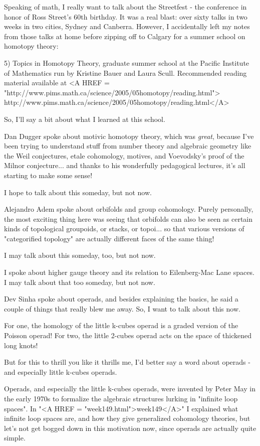 Speaking of math, I really want to talk about the Streetfest - the 
conference in honor of Ross Street's 60th birthday.  It was a real 
blast: over sixty talks in two weeks in two cities, Sydney and 
Canberra.  However, I accidentally left my notes from those talks 
at home before zipping off to Calgary for a summer school on 
homotopy theory:

5) Topics in Homotopy Theory, graduate summer school at the 
Pacific Institute of Mathematics run by Kristine Bauer and Laura 
Scull.  Recommended reading material available at 
<A HREF = "http://www.pims.math.ca/science/2005/05homotopy/reading.html">
http://www.pims.math.ca/science/2005/05homotopy/reading.html</A>

So, I'll say a bit about what I learned at this school.  

Dan Dugger spoke about motivic homotopy theory, which was
\emph{great}, because I've been trying to understand stuff
from number theory and algebraic geometry like the Weil 
conjectures, etale cohomology, motives, and Voevodsky's proof 
of the Milnor conjecture... and thanks to his wonderfully 
pedagogical lectures, it's all starting to make some sense!

I hope to talk about this someday, but not now.

Alejandro Adem spoke about orbifolds and group cohomology.
Purely personally, the most exciting thing here was seeing
that orbifolds can also be seen as certain kinds of topological 
groupoids, or stacks, or topoi... so that various versions of
"categorified topology" are actually different faces of the 
same thing!
  
I may talk about this someday, too, but not now.

I spoke about higher gauge theory and its relation to Eilenberg-Mac 
Lane spaces.  I may talk about that too someday, but not now.

Dev Sinha spoke about operads, and besides explaining the basics, 
he said a couple of things that really blew me away.  So, I want
to talk about this now.

For one, the homology of the little k-cubes operad is a graded 
version of the Poisson operad!  For two, the little 2-cubes 
operad acts on the space of thickened long knots!  

But for this to thrill you like it thrills me, I'd better say a
word about operads - and especially little k-cubes operads.

Operads, and especially the little k-cubes operads, were 
invented by Peter May in the early 1970s to formalize the 
algebraic structures lurking in "infinite loop spaces".  In 
"<A HREF = "week149.html">week149</A>" I explained what infinite loop spaces are, and how 
they give generalized cohomology theories, but let's not get 
bogged down in this motivation now, since operads are actually
quite simple.  

